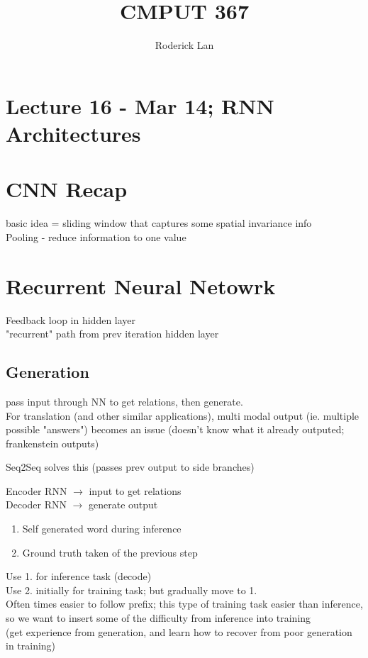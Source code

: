 \documentclass{article}
\title{CMPUT 367}
\author{Roderick Lan}
\date{}
\begin{document}
\maketitle

\tableofcontents
\break

\section*{Lecture 16 - Mar 14; RNN Architectures}

\section{CNN Recap}
basic idea = sliding window that captures some spatial invariance info 
\\
Pooling - reduce information to one value





\section{Recurrent Neural Netowrk}
Feedback loop in hidden layer
\\
"recurrent" path from prev iteration hidden layer


\subsection{Generation}
pass input through NN to get relations, then generate. 
\\
For translation (and other similar applications), multi modal output (ie. multiple
possible "answers") becomes an issue (doesn't know what it already outputed; 
frankenstein outputs)
\begin{list}{}{}
    \item Seq2Seq solves this (passes prev output to side branches)
\end{list}
\noindent
Encoder RNN $\to$ input to get relations
\\
Decoder RNN $\to$ generate output
\begin{enumerate}
    \item Self generated word during inference
    \item Ground truth taken of the previous step
\end{enumerate}
Use 1. for inference task (decode)
\\
Use 2. initially for training task; but gradually move to 1.
\\
Often times easier to follow prefix; 
this type of training task easier than inference, so we want to insert some of the
difficulty from inference into training\\
(get experience from generation, and learn how to recover from poor generation in training)
\end{document}
